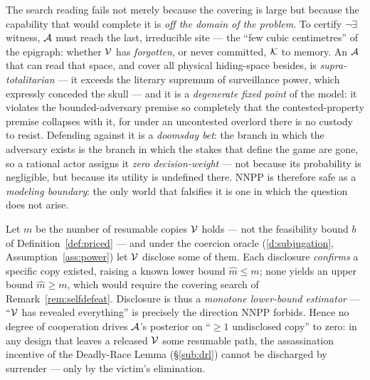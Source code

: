\begin{remark}\label{rem:selfdefeat}
The search reading fails not merely because the covering is large but because the
capability that would complete it is \emph{off the domain of the problem}. To
certify $\neg\exists$ witness, $\mathcal{A}$ must reach the last, irreducible site
--- the ``few cubic centimetres'' of the epigraph: whether $\mathcal{V}$ has
\emph{forgotten}, or never committed, $\mathcal{K}$ to memory. An $\mathcal{A}$ that can read
that space, and cover all physical hiding-space besides, is
\emph{supra-totalitarian} --- it exceeds the literary supremum of surveillance
power, which expressly conceded the skull --- and it is a \emph{degenerate fixed
point} of the model: it violates the bounded-adversary premise so completely that
the contested-property premise collapses with it, for under an uncontested
overlord there is no custody to resist. Defending against it is a \emph{doomsday
bet}: the branch in which the adversary exists is the branch in which the stakes
that define the game are gone, so a rational actor assigns it \emph{zero
decision-weight} --- not because its probability is negligible, but because its
utility is undefined there. NNPP is therefore safe as a \emph{modeling boundary}:
the only world that falsifies it is one in which the question does not arise.
\end{remark}

\begin{corollary}\label{cor:disclosure}
Let $m$ be the number of resumable copies $\mathcal{V}$ holds --- not the
feasibility bound $b$ of Definition~\ref{def:priced} --- and under the coercion
oracle (\ref{d:subjugation}, Assumption~\ref{ass:power}) let $\mathcal{V}$ disclose some of them. Each
disclosure \emph{confirms} a specific copy existed, raising a known lower bound
$\hat m \le m$; none yields an upper bound $\hat m \ge m$, which would require the
covering search of Remark~\ref{rem:selfdefeat}. Disclosure is thus a \emph{monotone
lower-bound estimator} --- ``$\mathcal{V}$ has revealed everything'' is precisely the
direction NNPP forbids. Hence no degree of cooperation drives $\mathcal{A}$'s
posterior on ``$\ge 1$ undisclosed copy'' to zero: in any design that leaves a
released $\mathcal{V}$ some resumable path, the assassination incentive of the
Deadly-Race Lemma (\S\ref{sub:drl}) cannot be discharged by surrender --- only by
the victim's elimination.
\end{corollary}


